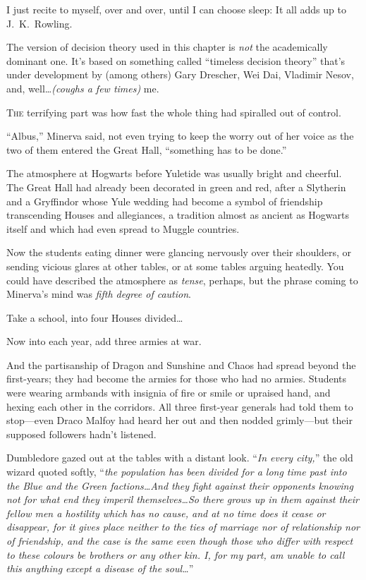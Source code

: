 
\begin{chapterOpeningAuthorNote}
I just recite to myself, over and over, until I can choose sleep: It all adds up to J.~K.~Rowling.

The version of decision theory used in this chapter is \emph{not} the academically dominant one. It’s based on something called “timeless decision theory” that’s under development by (among others) Gary Drescher, Wei Dai, Vladimir Nesov, and, well…\emph{(coughs a few times)} me.
\end{chapterOpeningAuthorNote}

\lettrine{T}{he} terrifying part was how fast the whole thing had spiralled out of control.

“Albus,” Minerva said, not even trying to keep the worry out of her voice as the two of them entered the Great Hall, “something has to be done.”

The atmosphere at Hogwarts before Yuletide was usually bright and cheerful. The Great Hall had already been decorated in green and red, after a Slytherin and a Gryffindor whose Yule wedding had become a symbol of friendship transcending Houses and allegiances, a tradition almost as ancient as Hogwarts itself and which had even spread to Muggle countries.

Now the students eating dinner were glancing nervously over their shoulders, or sending vicious glares at other tables, or at some tables arguing heatedly. You could have described the atmosphere as \emph{tense}, perhaps, but the phrase coming to Minerva’s mind was \emph{fifth degree of caution}.

Take a school, into four Houses divided…

Now into each year, add three armies at war.

And the partisanship of Dragon and Sunshine and Chaos had spread beyond the first-years; they had become the armies for those who had no armies. Students were wearing armbands with insignia of fire or smile or upraised hand, and hexing each other in the corridors. All three first-year generals had told them to stop—even Draco Malfoy had heard her out and then nodded grimly—but their supposed followers hadn’t listened.

Dumbledore gazed out at the tables with a distant look. “\emph{In every city,}” the old wizard quoted softly, “\emph{the population has been divided for a long time past into the Blue and the Green factions…And they fight against their opponents knowing not for what end they imperil themselves…So there grows up in them against their fellow men a hostility which has no cause, and at no time does it cease or disappear, for it gives place neither to the ties of marriage nor of relationship nor of friendship, and the case is the same even though those who differ with respect to these colours be brothers or any other kin. I, for my part, am unable to call this anything except a disease of the soul…}”

